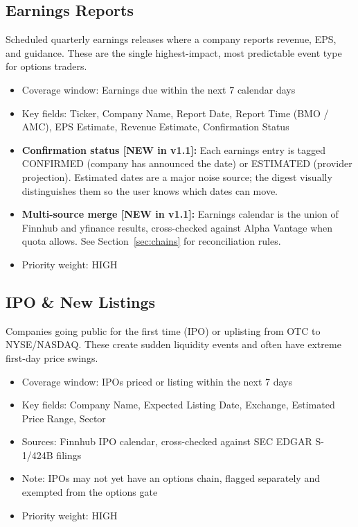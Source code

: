 \documentclass[11pt]{article}
\begin{document}
\subsection{Earnings Reports}
Scheduled quarterly earnings releases where a company reports revenue, EPS, and guidance. These are the single highest-impact, most predictable event type for options traders.
\begin{itemize}
  \item Coverage window: Earnings due within the next 7 calendar days
  \item Key fields: Ticker, Company Name, Report Date, Report Time (BMO / AMC), EPS Estimate, Revenue Estimate, Confirmation Status
  \item \textbf{Confirmation status [NEW in v1.1]:} Each earnings entry is tagged CONFIRMED (company has announced the date) or ESTIMATED (provider projection). Estimated dates are a major noise source; the digest visually distinguishes them so the user knows which dates can move.
  \item \textbf{Multi-source merge [NEW in v1.1]:} Earnings calendar is the union of Finnhub and yfinance results, cross-checked against Alpha Vantage when quota allows. See Section~\ref{sec:chains} for reconciliation rules.
  \item Priority weight: HIGH
\end{itemize}

\subsection{IPO \& New Listings}
Companies going public for the first time (IPO) or uplisting from OTC to NYSE/NASDAQ. These create sudden liquidity events and often have extreme first-day price swings.
\begin{itemize}
  \item Coverage window: IPOs priced or listing within the next 7 days
  \item Key fields: Company Name, Expected Listing Date, Exchange, Estimated Price Range, Sector
  \item Sources: Finnhub IPO calendar, cross-checked against SEC EDGAR S-1/424B filings
  \item Note: IPOs may not yet have an options chain, flagged separately and exempted from the options gate
  \item Priority weight: HIGH
\end{itemize}
\end{document}
